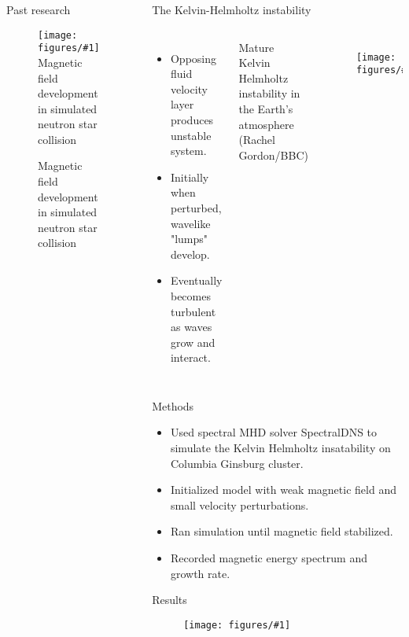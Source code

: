 \documentclass{beamer}
\newcommand{\myfig}[4]{
  \begin{figure}
    \centering
    \texttt{[image: figures/\#1]}
    \def\param{#4}
    \ifx\param\empty
    \else
      \caption{\param}
    \fi
    \label{fig:#3}
  \end{figure}
}
\begin{document}
\begin{frame}[t]
\begin{columns}
\begin{column}{0.5\textwidth}
\begin{block}{Past research}
        \myfig{merger.png}{0.8}{merger}{Magnetic field development in simulated neutron star collision \citep{palenzuela2022}}
      \end{block}
    \end{column}
    \begin{column}{0.5\textwidth}
      \begin{block}{The Kelvin-Helmholtz instability}
        \begin{columns}[t]
          \begin{itemize}
            \item Opposing fluid velocity layer produces unstable system.
            \item Initially when perturbed, wavelike "lumps" develop.
            \item Eventually becomes turbulent as waves grow and interact.
          \end{itemize}
          \vspace{1in}
          \begin{flushright} Mature Kelvin Helmholtz instability in the Earth's atmosphere (Rachel Gordon/BBC)\end{flushright}
          \myfig{clouds.png}{1.0}{clouds}{}
        \end{columns}
      \end{block}
      \begin{block}{Methods}
        \begin{itemize}
          \item Used spectral MHD solver SpectralDNS \citep{mortensen2016} to simulate the Kelvin Helmholtz insatability on Columbia Ginsburg cluster.
          \item Initialized model with weak magnetic field and small velocity perturbations.
          \item Ran simulation until magnetic field stabilized.
          \item Recorded magnetic energy spectrum and growth rate.
        \end{itemize}
      \end{block}
      \begin{block}{Results}
        \myfig{images.pdf}{0.9}{images}{}
        \begin{columns}[t]
          \begin{column}{0.3\textwidth}

\end{column}
\end{columns}
\end{block}
\end{column}
\end{columns}
\end{frame}
\end{document}
